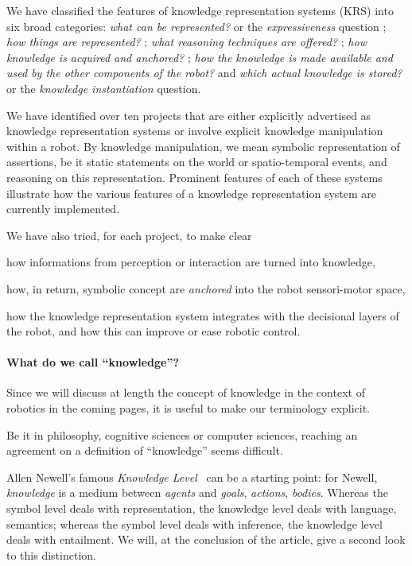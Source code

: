 \documentclass[a4paper, twocolumn]{article}
\begin{document}
We have classified the features of knowledge representation systems (KRS) into
six broad categories: \emph{what can be represented?} or the
\emph{expressiveness} question ; \emph{how things are represented?} ; \emph{what
reasoning techniques are offered?} ; \emph{how knowledge is acquired and
anchored?} ; \emph{how the knowledge is made available and used by the other
components of the robot?} and \emph{which actual knowledge is stored?} or the
\emph{knowledge instantiation} question.

We have identified over ten projects that are either explicitly advertised as
knowledge representation systems or involve explicit knowledge manipulation
within a robot. By knowledge manipulation, we mean symbolic representation of
assertions, be it static statements on the world or spatio-temporal events, and
reasoning on this representation. Prominent features of each of these systems
illustrate how the various features of a knowledge representation system are
currently implemented.

We have also tried, for each project, to make clear \begin{inparaenum} \item
how informations from perception or interaction are turned into knowledge,
\item how, in return, symbolic concept are \emph{anchored} into the robot
sensori-motor space, \item how the knowledge representation system integrates
with the decisional layers of the robot, and how this can improve or ease
robotic control.\end{inparaenum}

\paragraph{What do we call ``knowledge''?}
\label{sect|on-knowledge}

Since we will discuss at length the concept of knowledge in the context of
robotics in the coming pages, it is useful to make our terminology explicit.

Be it in philosophy, cognitive sciences or computer sciences, reaching an
agreement on a definition of ``knowledge'' seems difficult.

Allen Newell's famous \emph{Knowledge Level}~\cite{Newell1981} can be a
starting point: for Newell, \emph{knowledge} is a medium between \emph{agents}
and \emph{goals}, \emph{actions}, \emph{bodies}. Whereas the symbol level deals
with representation, the knowledge level deals with language, semantics;
whereas the symbol level deals with inference, the knowledge level deals with
entailment. We will, at the conclusion of the article, give a second look to
this distinction.
\end{document}
